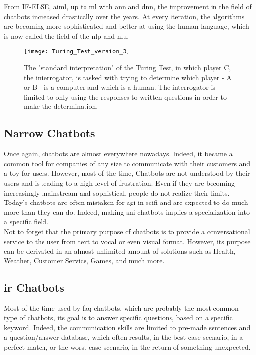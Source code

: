 From IF-ELSE, \gls{aiml}, up to \gls{ml} with \gls{ann} and \gls{dnn}, the improvement in the field of chatbots increased drastically over the years. At every iteration, the algorithms are becoming more sophisticated and better at using the human language, which is now called the field of the \gls{nlp} and \gls{nlu}.

\begin{figure}[ht!]
    \centering
    \texttt{[image: Turing\_Test\_version\_3]}
    \caption{
       The "standard interpretation" of the Turing Test, in which player C, the interrogator, is tasked with trying to determine which player - A or B - is a computer and which is a human. The interrogator is limited to only using the responses to written questions in order to make the determination. \cite{wikipedia:turing_test_img}
    }
    \label{fig:wikipedia_turing_test_img}
\end{figure}

\subsection{Narrow Chatbots}
Once again, chatbots are almost everywhere nowadays. Indeed, it became a common tool for companies of any size to communicate with their customers and a toy for users. However, most of the time, Chatbots are not understood by their users and is leading to a high level of frustration. Even if they are becoming increasingly mainstream and sophistical, people do not realize their limits. Today's chatbots are often mistaken for \gls{agi} in \gls{scifi} and are expected to do much more than they can do. Indeed, making \gls{ani} chatbots implies a specialization into a specific field.\\

Not to forget that the primary purpose of chatbots is to provide a conversational service to the user from text to vocal or even visual format. However, its purpose can be derivated in an almost unlimited amount of solutions such as Health, Weather, Customer Service, Games, and much more.

\subsection{\gls{ir} Chatbots}
Most of the time used by \gls{faq} chatbots, which are probably the most common type of chatbots, its goal is to answer specific questions, based on a specific keyword. Indeed, the communication skills are limited to pre-made sentences and a question/answer database, which often results, in the best case scenario, in a perfect match, or the worst case scenario, in the return of something unexpected.\\

